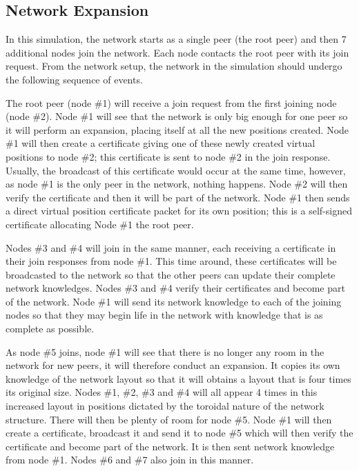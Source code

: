 \documentclass[ %
                    author={Luke Murray},
                supervisor={Dr. Simon Hollis},
                     title={Shadow Peer-to-Peer Networks},
                  subtitle={},
                    degree={MEng},
                      year={2013} ]{thesis}
\begin{document}
\subsection{Network Expansion}

In this simulation, the network starts as a single peer (the root peer) and then 7 additional nodes join the network. Each node contacts the root peer with its join request. From the network setup, the network in the simulation should undergo the following sequence of events.

The root peer (node \#1) will receive a join request from the first joining node (node \#2). Node \#1 will see that the network is only big enough for one peer so it will perform an expansion, placing itself at all the new positions created. Node \#1 will then create a certificate giving one of these newly created virtual positions to node \#2; this certificate is sent to node \#2 in the join response. Usually, the broadcast of this certificate would occur at the same time, however, as node \#1 is the only peer in the network, nothing happens. Node \#2 will then verify the certificate and then it will be part of the network. Node \#1 then sends a direct virtual position certificate packet for its own position; this is a self-signed certificate allocating Node \#1 the root peer.

Nodes \#3 and \#4 will join in the same manner, each receiving a certificate in their join responses from node \#1. This time around, these certificates will be broadcasted to the network so that the other peers can update their complete network knowledges. Nodes \#3 and \#4 verify their certificates and become part of the network. Node \#1 will send its network knowledge to each of the joining nodes so that they may begin life in the network with knowledge that is as complete as possible.

As node \#5 joins, node \#1 will see that there is no longer any room in the network for new peers, it will therefore conduct an expansion. It copies its own knowledge of the network layout so that it will obtains a layout that is four times its original size. Nodes \#1, \#2, \#3 and \#4 will all appear 4 times in this increased layout in positions dictated by the toroidal nature of the network structure. There will then be plenty of room for node \#5. Node \#1 will then create a certificate, broadcast it and send it to node \#5 which will then verify the certificate and become part of the network. It is then sent network knowledge from node \#1. Nodes \#6 and \#7 also join in this manner.
\end{document}
